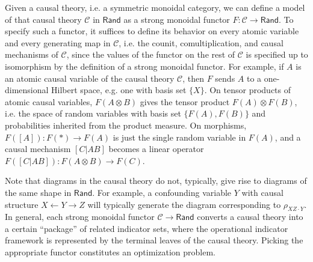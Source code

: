 \documentclass[sigconf]{acmart}
\newcommand{\Cat}[1]{\mathsf{#1}}
\def\Rand{\Cat{Rand}}
\begin{document}
Given a causal theory, i.e. a symmetric monoidal category, we can define a model of that causal theory $\mathcal{C}$ in $\Rand$ as a strong monoidal functor $F : \mathcal{C} \to \Rand$. To specify such a functor, it suffices to define its behavior on every atomic variable and every generating map in $\mathcal{C}$, i.e. the counit, comultiplication, and causal mechanisms of $\mathcal{C}$, since the values of the functor on the rest of $\mathcal{C}$ is specified up to isomorphism by the definition of a strong monoidal functor. For example, if $A$ is an atomic causal variable of the causal theory $\mathcal{C}$, then $F$ sends $A$ to a one-dimensional Hilbert space, e.g. one with basis set $\{X\}$. On tensor products of atomic causal variables, $F(A \otimes B)$ gives the tensor product $F(A) \otimes F(B)$, i.e. the space of random variables with basis set $\{F(A), F(B)\}$ and probabilities inherited from the product measure. On morphisms, $F([A]) : F(\ast) \to F(A)$ is just the single random variable in $F(A)$, and a causal mechanism $[C|AB]$ becomes a linear operator $F([C|AB]) : F(A \otimes B) \to F(C)$. %

Note that diagrams in the causal theory do not, typically, give rise to diagrams of the same shape in $\Rand$. For example, a confounding variable $Y$ with causal structure $X \leftarrow Y \to Z$ will typically generate the diagram corresponding to $\rho_{XZ\cdot Y}$. In general, each strong monoidal functor $\mathcal{C} \to \Rand$ converts a causal theory into a certain ``package'' of related indicator sets, where the operational indicator framework is represented by the terminal leaves of the causal theory. Picking the appropriate functor constitutes an optimization problem.



\end{document}

